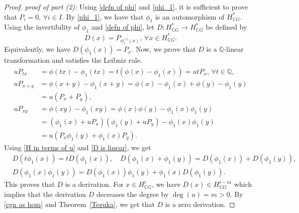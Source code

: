 \documentclass{amsart}
\newcommand{\thmref}[1]{Theorem~\ref{#1}}
\begin{document}
\begin{proof}
		
		\textit{proof of part (2):} Using %
\eqref{defn of phi} and \eqref{phi_1}, it is sufficient to prove that $P_i =0, \, \forall i \in I$. By \eqref{phi_1}, we have that $\phi_1$ is an automorphism of $H^*_{\mathbb CG}$. Using the invertibility of $\phi_1$ and \eqref{defn of phi}, let $D: H^*_{\mathbb{C}G} \rightarrow H^*_{\mathbb{C}G}$ be defined by $$D(x) = P_{\phi_1^{-1}(x)},\, \forall x \in H^*_{\mathbb{C}G}.$$
		Equivalently, we have $D(\phi_1(x)) = P_x$. Now, we prove that $D$ is a $\mathbb Q$-linear transformation and satisfies the Leibniz %
rule.
		\begin{equation}\label{D is linear}
			\begin{split}
				uP_{tx} &= \phi(tx) - \phi_1(tx) = t(\phi(x) - \phi_1(x)) = utP_{x},\, \forall t \in \mathbb{Q},\\
				uP_{x + y} &= \phi(x+y) - \phi_1(x+y) = \phi(x) - \phi_1(x)+ \phi(y) - \phi_1(y)\\ &= u(P_{x}+P_{y}),\\
				uP_{x y} &= \phi(x y) - \phi_1(xy) = \phi(x)\phi(y)-\phi_1(x)\phi_1(y) \\
				&= (\phi_1(x)+uP_{x})(\phi_1(y)+uP_y)- \phi_1(x)\phi_1(y)\\
				&= u(P_x\phi_1(y)+\phi_1(x)P_y).
			\end{split}
		\end{equation}
		Using %
\eqref{H in terms of u} and \eqref{D is linear}, we %
get  \begin{align*}
			& D(t\phi_1(x)) = tD(\phi_1(x)),\quad D(\phi_1(x)+\phi_1(y)) = D(\phi_1(x))+D(\phi_1(y)),\\
			&D(\phi_1(x)\phi_1(y)) = D(\phi_1(x))\phi_1(y)+\phi_1(x)D(\phi_1(y)).
		\end{align*}
		This %
proves that $D$ is a derivation. For $x \in H^i_{\mathbb{C}G}$, we have $D(x) \in H^{i-m}_{\mathbb{C}G}$ which implies that the derivation $D$ decreases the degree by $\deg(u)=m>0$. By \eqref{cgn as hom} and \thmref{Tezuka}, we get that $D$ is a zero derivation. %

\end{proof}
\end{document}
